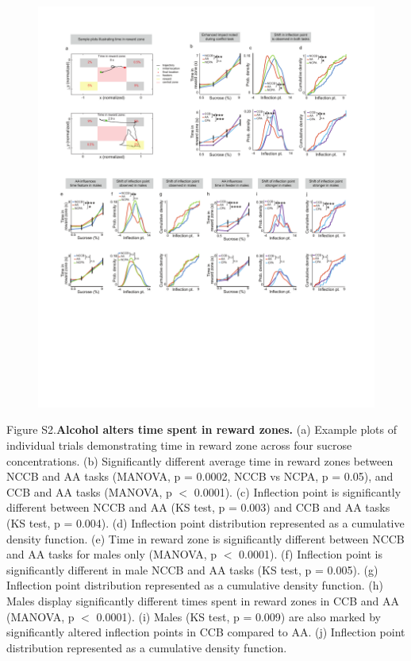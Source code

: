 \documentclass{article}
\newcounter{suppfig}
\renewcommand{\thesuppfig}{S\arabic{suppfig}}  %
\newenvironment{suppfigure}[1][htbp]
  {\refstepcounter{suppfig}%
   \begin{figure}[#1]%
   \renewcommand{\thefigure}{\thesuppfig}}%
  {\end{figure}}
\begin{document}
\clearpage

\begin{suppfigure}
  \centering
  \includegraphics[width=\textwidth, trim=50 100 50 100]{Figs/Alcohol_SI_2.pdf}
  \label{fig:Alcohol_SI_2}
\end{suppfigure}

\clearpage

\begin{singlespace}
\noindent Figure S2.\textbf{Alcohol alters time spent in reward zones.} (a) Example plots of individual trials demonstrating time in reward zone across four sucrose concentrations. (b) Significantly different average time in reward zones between NCCB and AA tasks (MANOVA, p = 0.0002, NCCB vs NCPA, p = 0.05), and CCB and AA tasks (MANOVA, p $<$ 0.0001). (c) Inflection point is significantly different between NCCB and AA (KS test, p = 0.003) and CCB and AA tasks (KS test, p = 0.004). (d) Inflection point distribution represented as a cumulative density function. (e) Time in reward zone is significantly different between NCCB and AA tasks for males only (MANOVA, p $<$ 0.0001). (f) Inflection point is significantly different in male NCCB and AA tasks (KS test, p = 0.005). (g) Inflection point distribution represented as a cumulative density function. (h) Males display significantly different times spent in reward zones in CCB and AA (MANOVA, p $<$ 0.0001). (i) Males (KS test, p = 0.009) are also marked by significantly altered inflection points in CCB compared to AA. (j) Inflection point distribution represented as a cumulative density function.
\end{singlespace}
\end{document}
